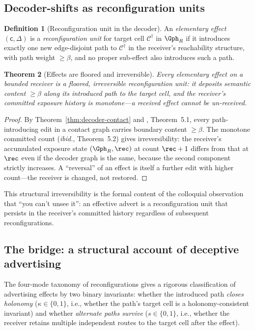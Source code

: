 \documentclass[twocolumn,11pt,a4paper]{article}
\theoremstyle{adv}
\newtheorem{theorem}{Theorem}[section]
\theoremstyle{definition}
\newtheorem{definition}[theorem]{Definition}
\theoremstyle{remark}
\newcommand{\Cell}{\mathcal{C}}        %
\newcommand{\Recv}{R}                  %
\newcommand{\floor}{\beta}            %
\newcommand{\Carrier}{\kappa}         %
\renewcommand{\Carrier}{\mathsf{c}}
\newcommand{\shift}{\Delta}            %
\begin{document}
\subsection{Decoder-shifts as reconfiguration units}

\begin{definition}[Reconfiguration unit in the decoder]
\label{def:reconfig-unit}
An \emph{elementary effect} $(\Carrier,\shift)$ is a \emph{reconfiguration unit}
for target cell $\Cell^\dagger$ in $\Gph_\Recv$ if it introduces exactly one new
edge-disjoint path to $\Cell^\dagger$ in the receiver's reachability structure,
with path weight $\ge\floor$, and no proper sub-effect also introduces such a
path.
\end{definition}

\begin{theorem}[Effects are floored and irreversible]
\label{thm:effect-unit}
Every elementary effect on a bounded receiver is a floored, irreversible
reconfiguration unit: it deposits semantic content $\ge\floor$ along its
introduced path to the target cell, and the receiver's committed exposure
history is monotone---a received effect cannot be un-received.
\end{theorem}

\begin{proof}
By Theorem~\ref{thm:decoder-contact} and \citet{sachikonye2025knowledge},
Theorem~5.1, every path-introducing edit in a contact graph carries boundary
content $\ge\floor$. The monotone committed count (\textit{ibid.}, Theorem~5.2)
gives irreversibility: the receiver's accumulated exposure state
$(\Gph_\Recv,\rec)$ at count $\rec+1$ differs from that at $\rec$ even if the
decoder graph is the same, because the second component strictly increases. A
``reversal'' of an effect is itself a further edit with higher count---the
receiver is changed, not restored.
\end{proof}

This structural irreversibility is the formal content of the colloquial
observation that ``you can't unsee it'': an effective advert is a reconfiguration
unit that persists in the receiver's committed history regardless of subsequent
reconfigurations.

\subsection{The bridge: a structural account of deceptive advertising}

The four-mode taxonomy of reconfigurations \citep{sachikonye2025knowledge}
gives a rigorous classification of advertising effects by two binary invariants:
whether the introduced path \emph{closes holonomy} ($\kappa\in\{0,1\}$, i.e.,
whether the path's target cell is a holonomy-consistent invariant) and whether
\emph{alternate paths survive} ($s\in\{0,1\}$, i.e., whether the receiver
retains multiple independent routes to the target cell after the effect).
\end{document}
